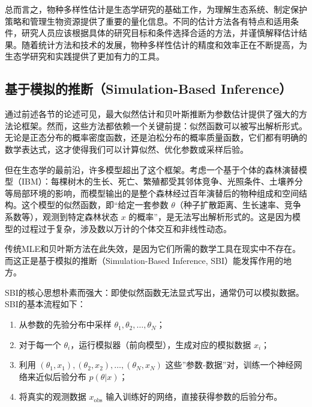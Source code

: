 \documentclass[
  twoside,12pt,fontset=none]{ctexbook}
\providecommand{\tightlist}{%
  \setlength{\itemsep}{0pt}\setlength{\parskip}{0pt}}
\begin{document}
总而言之，物种多样性估计是生态学研究的基础工作，为理解生态系统、制定保护策略和管理生物资源提供了重要的量化信息。不同的估计方法各有特点和适用条件，研究人员应该根据具体的研究目标和条件选择合适的方法，并谨慎解释估计结果。随着统计方法和技术的发展，物种多样性估计的精度和效率正在不断提高，为生态学研究和实践提供了更加有力的工具。

\hypertarget{ux57faux4e8eux6a21ux62dfux7684ux63a8ux65adsimulation-based-inference}{%
\subsection{基于模拟的推断（Simulation-Based Inference）}\label{ux57faux4e8eux6a21ux62dfux7684ux63a8ux65adsimulation-based-inference}}

通过前述各节的论述可见，最大似然估计和贝叶斯推断为参数估计提供了强大的方法论框架。然而，这些方法都依赖一个关键前提：似然函数可以被写出解析形式。无论是正态分布的概率密度函数，还是泊松分布的概率质量函数，它们都有明确的数学表达式，这才使得我们可以计算似然、优化参数或采样后验。

但在生态学的最前沿，许多模型超出了这个框架。考虑一个基于个体的森林演替模型（IBM）：每棵树木的生长、死亡、繁殖都受其邻体竞争、光照条件、土壤养分等局部环境的影响，而模型输出的是整个森林经过百年演替后的物种组成和空间结构。这个模型的似然函数，即``给定一套参数 \(\theta\)（种子扩散距离、生长速率、竞争系数等），观测到特定森林状态 \(x\) 的概率''，是无法写出解析形式的。这是因为模型的过程过于复杂，涉及数以万计的个体交互和非线性动态。

传统MLE和贝叶斯方法在此失效，是因为它们所需的数学工具在现实中不存在。而这正是基于模拟的推断（Simulation-Based Inference, SBI）能发挥作用的地方。

SBI的核心思想朴素而强大：即使似然函数无法显式写出，通常仍可以模拟数据。SBI的基本流程如下：

\begin{enumerate}
\def\labelenumi{\arabic{enumi}.}
\tightlist
\item
  从参数的先验分布中采样 \(\theta_1, \theta_2, \ldots, \theta_N\)；
\item
  对于每一个 \(\theta_i\)，运行模拟器（前向模型），生成对应的模拟数据 \(x_i\)；
\item
  利用 \((\theta_1, x_1), (\theta_2, x_2), \ldots, (\theta_N, x_N)\) 这些''参数-数据''对，训练一个神经网络来近似后验分布 \(p(\theta|x)\)；
\item
  将真实的观测数据 \(x_{\text{obs}}\) 输入训练好的网络，直接获得参数的后验分布。
\end{enumerate}
\end{document}

